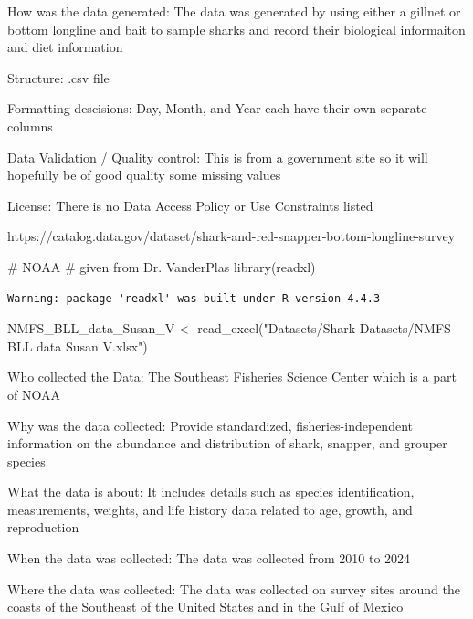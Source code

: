 \documentclass[
  letterpaper,
  DIV=11,
  numbers=noendperiod]{scrreprt}
\newenvironment{Shaded}{\begin{snugshade}}{\end{snugshade}}
\newcommand{\CommentTok}[1]{\textcolor[rgb]{0.37,0.37,0.37}{#1}}
\newcommand{\FunctionTok}[1]{\textcolor[rgb]{0.28,0.35,0.67}{#1}}
\newcommand{\NormalTok}[1]{\textcolor[rgb]{0.00,0.23,0.31}{#1}}
\newcommand{\OtherTok}[1]{\textcolor[rgb]{0.00,0.23,0.31}{#1}}
\newcommand{\StringTok}[1]{\textcolor[rgb]{0.13,0.47,0.30}{#1}}
\begin{document}
How was the data generated: The data was generated by using either a
gillnet or bottom longline and bait to sample sharks and record their
biological informaiton and diet information

Structure: .csv file

Formatting descisions: Day, Month, and Year each have their own separate
columns

Data Validation / Quality control: This is from a government site so it
will hopefully be of good quality some missing values

License: There is no Data Access Policy or Use Constraints listed

https://catalog.data.gov/dataset/shark-and-red-snapper-bottom-longline-survey

\begin{Shaded}
\begin{Highlighting}[]
\CommentTok{\# NOAA }
\CommentTok{\# given from Dr. VanderPlas }
\FunctionTok{library}\NormalTok{(readxl)}
\end{Highlighting}
\end{Shaded}

\begin{verbatim}
Warning: package 'readxl' was built under R version 4.4.3
\end{verbatim}

\begin{Shaded}
\begin{Highlighting}[]
\NormalTok{NMFS\_BLL\_data\_Susan\_V }\OtherTok{\textless{}{-}} \FunctionTok{read\_excel}\NormalTok{(}\StringTok{"Datasets/Shark Datasets/NMFS BLL data Susan V.xlsx"}\NormalTok{)}
\end{Highlighting}
\end{Shaded}

Who collected the Data: The Southeast Fisheries Science Center which is
a part of NOAA

Why was the data collected: Provide standardized, fisheries-independent
information on the abundance and distribution of shark, snapper, and
grouper species

What the data is about: It includes details such as species
identification, measurements, weights, and life history data related to
age, growth, and reproduction

When the data was collected: The data was collected from 2010 to 2024

Where the data was collected: The data was collected on survey sites
around the coasts of the Southeast of the United States and in the Gulf
of Mexico
\end{document}
